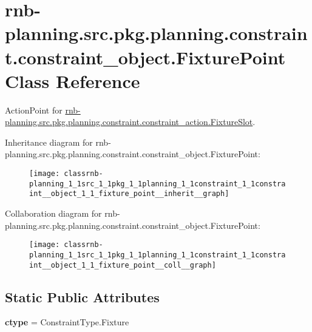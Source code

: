\hypertarget{classrnb-planning_1_1src_1_1pkg_1_1planning_1_1constraint_1_1constraint__object_1_1_fixture_point}{}\section{rnb-\/planning.src.\+pkg.\+planning.\+constraint.\+constraint\+\_\+object.\+Fixture\+Point Class Reference}
\label{classrnb-planning_1_1src_1_1pkg_1_1planning_1_1constraint_1_1constraint__object_1_1_fixture_point}


Action\+Point for \hyperlink{classrnb-planning_1_1src_1_1pkg_1_1planning_1_1constraint_1_1constraint__action_1_1_fixture_slot}{rnb-\/planning.\+src.\+pkg.\+planning.\+constraint.\+constraint\+\_\+action.\+Fixture\+Slot}.  




Inheritance diagram for rnb-\/planning.src.\+pkg.\+planning.\+constraint.\+constraint\+\_\+object.\+Fixture\+Point\+:\nopagebreak
\begin{figure}[H]
\begin{center}
\leavevmode
\texttt{[image: classrnb-planning\_1\_1src\_1\_1pkg\_1\_1planning\_1\_1constraint\_1\_1constraint\_\_object\_1\_1\_fixture\_point\_\_inherit\_\_graph]}
\end{center}
\end{figure}


Collaboration diagram for rnb-\/planning.src.\+pkg.\+planning.\+constraint.\+constraint\+\_\+object.\+Fixture\+Point\+:\nopagebreak
\begin{figure}[H]
\begin{center}
\leavevmode
\texttt{[image: classrnb-planning\_1\_1src\_1\_1pkg\_1\_1planning\_1\_1constraint\_1\_1constraint\_\_object\_1\_1\_fixture\_point\_\_coll\_\_graph]}
\end{center}
\end{figure}
\subsection*{Static Public Attributes}
\begin{DoxyCompactItemize}
\item 
\mbox{\label{classrnb-planning_1_1src_1_1pkg_1_1planning_1_1constraint_1_1constraint__object_1_1_fixture_point_a7e6807cb582730175391b7ceaa1ac71e}} 
{\bfseries ctype} = Constraint\+Type.\+Fixture
\end{DoxyCompactItemize}
